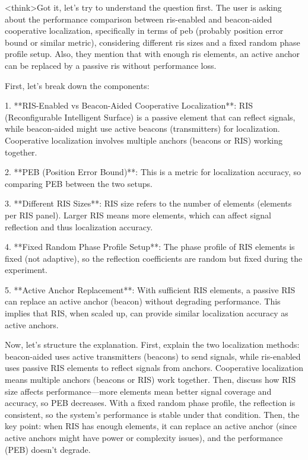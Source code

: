 <think>Got it, let's try to understand the question first. The user is asking about the performance comparison between ris-enabled and beacon-aided cooperative localization, specifically in terms of peb (probably position error bound or similar metric), considering different ris sizes and a fixed random phase profile setup. Also, they mention that with enough ris elements, an active anchor can be replaced by a passive ris without performance loss.

First, let's break down the components:

1. **RIS-Enabled vs Beacon-Aided Cooperative Localization**: RIS (Reconfigurable Intelligent Surface) is a passive element that can reflect signals, while beacon-aided might use active beacons (transmitters) for localization. Cooperative localization involves multiple anchors (beacons or RIS) working together.

2. **PEB (Position Error Bound)**: This is a metric for localization accuracy, so comparing PEB between the two setups.

3. **Different RIS Sizes**: RIS size refers to the number of elements (elements per RIS panel). Larger RIS means more elements, which can affect signal reflection and thus localization accuracy.

4. **Fixed Random Phase Profile Setup**: The phase profile of RIS elements is fixed (not adaptive), so the reflection coefficients are random but fixed during the experiment.

5. **Active Anchor Replacement**: With sufficient RIS elements, a passive RIS can replace an active anchor (beacon) without degrading performance. This implies that RIS, when scaled up, can provide similar localization accuracy as active anchors.

Now, let's structure the explanation. First, explain the two localization methods: beacon-aided uses active transmitters (beacons) to send signals, while ris-enabled uses passive RIS elements to reflect signals from anchors. Cooperative localization means multiple anchors (beacons or RIS) work together. Then, discuss how RIS size affects performance—more elements mean better signal coverage and accuracy, so PEB decreases. With a fixed random phase profile, the reflection is consistent, so the system's performance is stable under that condition. Then, the key point: when RIS has enough elements, it can replace an active anchor (since active anchors might have power or complexity issues), and the performance (PEB) doesn't degrade.

